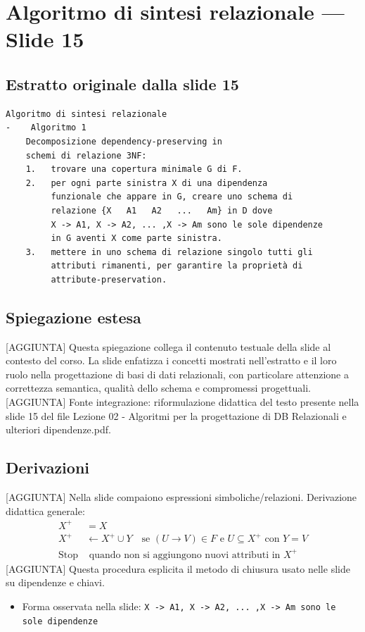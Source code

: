 \documentclass[11pt]{article}
\begin{document}
\section{Algoritmo di sintesi relazionale --- Slide 15}
\subsection*{Estratto originale dalla slide 15}
\begin{lstlisting}
Algoritmo di sintesi relazionale
-    Algoritmo 1
    Decomposizione dependency-preserving in
    schemi di relazione 3NF:
    1.   trovare una copertura minimale G di F.
    2.   per ogni parte sinistra X di una dipendenza
         funzionale che appare in G, creare uno schema di
         relazione {X   A1   A2   ...   Am} in D dove
         X -> A1, X -> A2, ... ,X -> Am sono le sole dipendenze
         in G aventi X come parte sinistra.
    3.   mettere in uno schema di relazione singolo tutti gli
         attributi rimanenti, per garantire la proprietà di
         attribute-preservation.
\end{lstlisting}
\subsection*{Spiegazione estesa}
[AGGIUNTA] Questa spiegazione collega il contenuto testuale della slide al contesto del corso. La slide enfatizza i concetti mostrati nell'estratto e il loro ruolo nella progettazione di basi di dati relazionali, con particolare attenzione a correttezza semantica, qualità dello schema e compromessi progettuali.
[AGGIUNTA] Fonte integrazione: riformulazione didattica del testo presente nella slide 15 del file Lezione 02 - Algoritmi per la progettazione di DB Relazionali e ulteriori dipendenze.pdf.
\subsection*{Derivazioni}
[AGGIUNTA] Nella slide compaiono espressioni simboliche/relazioni. Derivazione didattica generale:
\begin{align*}
X^+ &= X \\
X^+ &\leftarrow X^+ \cup Y \quad \text{se } (U \to V) \in F \text{ e } U \subseteq X^+ \text{ con } Y=V \\
\text{Stop} &\text{ quando non si aggiungono nuovi attributi in } X^+
\end{align*}
[AGGIUNTA] Questa procedura esplicita il metodo di chiusura usato nelle slide su dipendenze e chiavi.
\begin{itemize}[leftmargin=*]
\item Forma osservata nella slide: \texttt{X -> A1, X -> A2, ... ,X -> Am sono le sole dipendenze}
\end{itemize}
\end{document}
